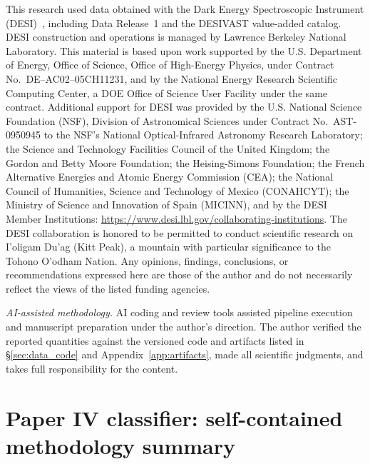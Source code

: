 \documentclass[aps,prd,twocolumn,superscriptaddress,showpacs,preprintnumbers,nofootinbib,longbibliography,floatfix]{revtex4-2}
\begin{document}
\fi
\begin{acknowledgments}
This research used data obtained with the Dark Energy Spectroscopic
Instrument (DESI)~\cite{DESI2025DR1}, including Data Release~1 and the
DESIVAST value-added catalog. DESI construction and operations is managed
by Lawrence Berkeley National Laboratory. This material is based upon
work supported by the U.S. Department of Energy, Office of Science,
Office of High-Energy Physics, under Contract No.~DE--AC02--05CH11231,
and by the National Energy Research Scientific Computing Center, a DOE
Office of Science User Facility under the same contract. Additional
support for DESI was provided by the U.S. National Science Foundation
(NSF), Division of Astronomical Sciences under Contract No.~AST-0950945
to the NSF's National Optical-Infrared Astronomy Research Laboratory;
the Science and Technology Facilities Council of the United Kingdom;
the Gordon and Betty Moore Foundation; the Heising-Simons Foundation;
the French Alternative Energies and Atomic Energy Commission (CEA); the
National Council of Humanities, Science and Technology of Mexico
(CONAHCYT); the Ministry of Science and Innovation of Spain (MICINN),
and by the DESI Member Institutions:
\url{https://www.desi.lbl.gov/collaborating-institutions}. The DESI
collaboration is honored to be permitted to conduct scientific research
on I'oligam Du'ag (Kitt Peak), a mountain with particular significance
to the Tohono O'odham Nation. Any opinions, findings, conclusions, or
recommendations expressed here are those of the author and do not
necessarily reflect the views of the listed funding agencies.

\textit{AI-assisted methodology.} AI coding and review tools assisted
pipeline execution and manuscript preparation under the author's
direction. The author verified the reported quantities against the
versioned code and artifacts listed in \S\ref{sec:data_code} and
Appendix~\ref{app:artifacts}, made all scientific judgments, and takes
full responsibility for the content.
\end{acknowledgments}

\appendix
\section{Paper IV classifier: self-contained methodology summary}\label{app:paper4_methods}
\end{document}
